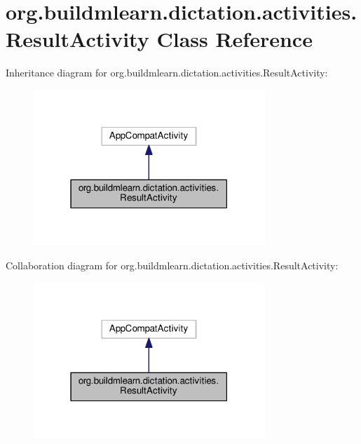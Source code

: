 \hypertarget{classorg_1_1buildmlearn_1_1dictation_1_1activities_1_1ResultActivity}{}\section{org.\+buildmlearn.\+dictation.\+activities.\+Result\+Activity Class Reference}
\label{classorg_1_1buildmlearn_1_1dictation_1_1activities_1_1ResultActivity}


Inheritance diagram for org.\+buildmlearn.\+dictation.\+activities.\+Result\+Activity\+:
\nopagebreak
\begin{figure}[H]
\begin{center}
\leavevmode
\includegraphics[width=247pt]{classorg_1_1buildmlearn_1_1dictation_1_1activities_1_1ResultActivity__inherit__graph}
\end{center}
\end{figure}


Collaboration diagram for org.\+buildmlearn.\+dictation.\+activities.\+Result\+Activity\+:
\nopagebreak
\begin{figure}[H]
\begin{center}
\leavevmode
\includegraphics[width=247pt]{classorg_1_1buildmlearn_1_1dictation_1_1activities_1_1ResultActivity__coll__graph}
\end{center}
\end{figure}
